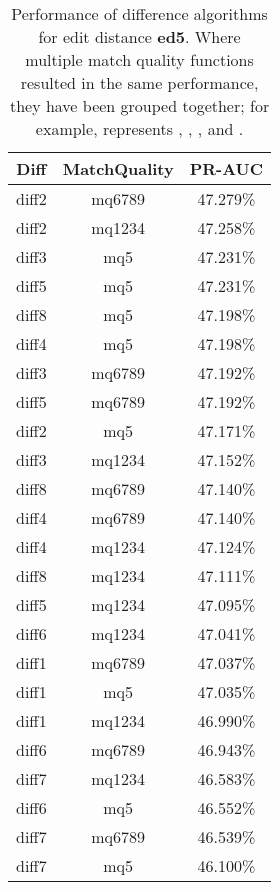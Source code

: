 \begin{table}[tbph]
\begin{center}
\begin{tabular}{|c|c||c|}
\hline
Diff & MatchQuality & PR-AUC  \\
\hline
\hline
diff2 & mq6789 & 47.279\% \\
diff2 & mq1234 & 47.258\% \\
diff3 & mq5 & 47.231\% \\
diff5 & mq5 & 47.231\% \\
diff8 & mq5 & 47.198\% \\
diff4 & mq5 & 47.198\% \\
diff3 & mq6789 & 47.192\% \\
diff5 & mq6789 & 47.192\% \\
diff2 & mq5 & 47.171\% \\
diff3 & mq1234 & 47.152\% \\
diff8 & mq6789 & 47.140\% \\
diff4 & mq6789 & 47.140\% \\
diff4 & mq1234 & 47.124\% \\
diff8 & mq1234 & 47.111\% \\
diff5 & mq1234 & 47.095\% \\
diff6 & mq1234 & 47.041\% \\
diff1 & mq6789 & 47.037\% \\
diff1 & mq5 & 47.035\% \\
diff1 & mq1234 & 46.990\% \\
diff6 & mq6789 & 46.943\% \\
diff7 & mq1234 & 46.583\% \\
diff6 & mq5 & 46.552\% \\
diff7 & mq6789 & 46.539\% \\
diff7 & mq5 & 46.100\% \\
\hline
\end{tabular}
\end{center}
\caption[Comparison of diff algorithms using edit distance \textbf{ed5}]{
  Performance of difference algorithms for
  edit distance \textbf{ed5}.  Where multiple match
  quality functions resulted in the same performance, they
  have been grouped together; for example,  represents
  , , , and .}
\label{tab:editlongbyed5}
\end{table}
